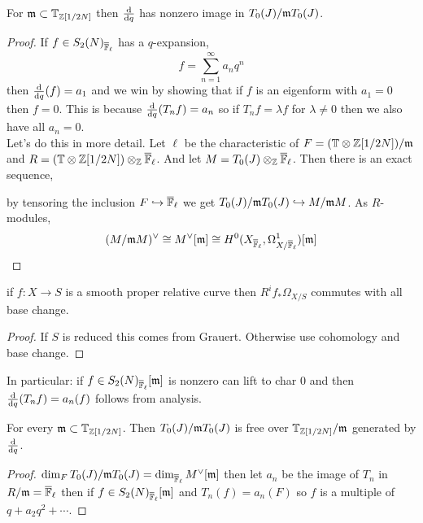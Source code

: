 \documentclass[12pt]{article}
\begin{document}
\begin{lemma}
For $\mathfrak{m} \subset \mathbb{T}_{\mathbb{Z}[1/2N]}$ then $\frac{\mathrm{d}{}}{\mathrm{d}{q}}$ has nonzero image in $T_0(J) / \mathfrak{m} T_0(J)$.
\end{lemma}

\begin{proof}
If $f \in S_2(N)_{\overline{\mathbb{F}}_\ell}$ has a $q$-expansion,
\[ f = \sum_{n = 1}^\infty a_n q^n \]
then $\frac{\mathrm{d}{}}{\mathrm{d}{q}}(f) = a_1$ and we win by showing that if $f$ is an eigenform with $a_1 = 0$ then $f = 0$. This is because $\frac{\mathrm{d}{}}{\mathrm{d}{q}} (T_n f) = a_n$ so if $T_n f = \lambda f$ for $\lambda \neq 0$ then we also have all $a_n = 0$. 
\bigskip\\
Let's do this in more detail. Let $\ell$ be the characteristic of $F = (\mathbb{T} \otimes \mathbb{Z}[1/2N]) / \mathfrak{m}$ and $R = (\mathbb{T} \otimes \mathbb{Z}[1/2N]) \otimes_{\mathbb{Z}} \overline{\mathbb{F}}_\ell$. And let $M = T_0(J) \otimes_{\mathbb{Z}} \overline{\mathbb{F}}_\ell$. Then there is an exact sequence,
\begin{center}
\end{center} 
by tensoring the inclusion $F \hookrightarrow \overline{\mathbb{F}}_\ell$ we get $T_0(J) / \mathfrak{m} T_0(J) \hookrightarrow M / \mathfrak{m} M$. As $R$-modules,
\[ (M / \mathfrak{m} M)^\vee \cong M^\vee[\mathfrak{m}] \cong H^0(X_{\overline{\mathbb{F}}_\ell}, \Omega^1_{X/ \overline{\mathbb{F}}_\ell})[\mathfrak{m}] \]
\end{proof}

\begin{theorem}
if $f : X \to S$ is a smooth proper relative curve then $R^i f_* \Omega_{X/S}$ commutes with all base change.
\end{theorem}

\begin{proof}
If $S$ is reduced this comes from Grauert. Otherwise use cohomology and base change.
\end{proof}

In particular: if $f \in S_2(N)_{\overline{\mathbb{F}}_\ell}[\mathfrak{m}]$ is nonzero can lift to char $0$ and then $\frac{\mathrm{d}{}}{\mathrm{d}{q}} (T_n f) = a_n(f)$ follows from analysis. 

\begin{lemma}
For every $\mathfrak{m} \subset \mathbb{T}_{\mathbb{Z}[1/2N]}$. Then $T_0(J) / \mathfrak{m} T_0(J)$ is free over $\mathbb{T}_{\mathbb{Z}[1/2N]} / \mathfrak{m}$ generated by $\frac{\mathrm{d}{}}{\mathrm{d}{q}}$. 
\end{lemma}

\begin{proof}
$\dim_F T_0(J) / \mathfrak{m} T_0(J) = \dim_{\overline{\mathbb{F}}_\ell} M^\vee[\mathfrak{m}]$ then let $a_n$ be the image of $T_n$ in $R / \mathfrak{m} = \overline{\mathbb{F}}_\ell$ then if $f \in S_2(N)_{\overline{\mathbb{F}}_\ell}[\mathfrak{m}]$ and $T_n(f) = a_n(F)$ so $f$ is a multiple of $q + a_2 q^2 + \cdots$. 
\end{proof}
\end{document}
